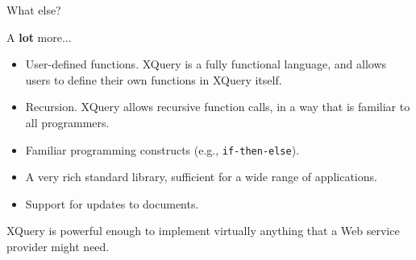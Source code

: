 \begin{frame}{What else?}

A \textbf{lot} more...

\begin{itemize}[-]
\item \alert{User-defined functions}. XQuery is a fully functional language, and allows users to define their own functions in XQuery itself.

\item \alert{Recursion}. XQuery allows recursive function calls, in a way that is familiar to all programmers.

\item Familiar \alert{programming constructs} (e.g., \lstinline[style=XQuery]{if-then-else}). 

\item A very rich \alert{standard library}, sufficient for a wide range of applications.

\item Support for \alert{updates} to documents.
\end{itemize}

XQuery is powerful enough to implement virtually anything that a Web service provider might need.

\end{frame}









